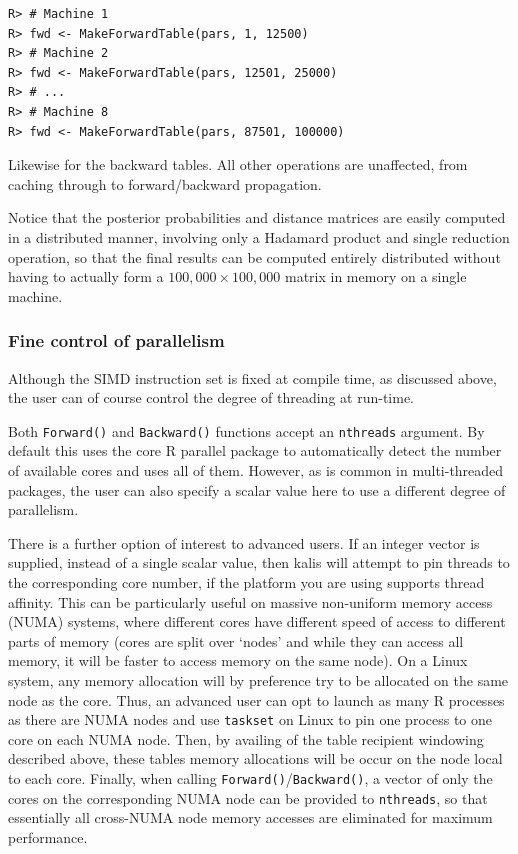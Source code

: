 \documentclass[a4paper]{article}
\let\proglang=\textsf
\newcommand{\pkg}[1]{{\fontseries{m}\fontseries{b}\selectfont #1}}
\begin{document}
\begin{verbatim}
R> # Machine 1
R> fwd <- MakeForwardTable(pars, 1, 12500)
R> # Machine 2
R> fwd <- MakeForwardTable(pars, 12501, 25000)
R> # ...
R> # Machine 8
R> fwd <- MakeForwardTable(pars, 87501, 100000)
\end{verbatim}

Likewise for the backward tables.
All other operations are unaffected, from caching through to forward/backward propagation.

Notice that the posterior probabilities and distance matrices are easily computed in a distributed manner, involving only a Hadamard product and single reduction operation, so that the final results can be computed entirely distributed without having to actually form a \(100,000 \times 100,000\) matrix in memory on a single machine.



\subsubsection*{Fine control of parallelism}
\label{fine-control-of-parallelism}

Although the SIMD instruction set is fixed at compile time, as discussed above, the user can of course control the degree of threading at run-time.

Both \texttt{Forward()} and \texttt{Backward()} functions accept an \texttt{nthreads} argument.
By default this uses the core \proglang{R} \pkg{parallel} package to automatically detect the number of available cores and uses all of them.
However, as is common in multi-threaded packages, the user can also specify a scalar value here to use a different degree of parallelism.

There is a further option of interest to advanced users.
If an integer vector is supplied, instead of a single scalar value, then \pkg{kalis} will attempt to pin threads to the corresponding core number, if the platform you are using supports thread affinity.
This can be particularly useful on massive non-uniform memory access (NUMA) systems, where different cores have different speed of access to different parts of memory (cores are split over `nodes' and while they can access all memory, it will be faster to access memory on the same node).
On a Linux system, any memory allocation will by preference try to be allocated on the same node as the core.
Thus, an advanced user can opt to launch as many \proglang{R} processes as there are NUMA nodes and use \texttt{taskset} on Linux to pin one process to one core on each NUMA node.
Then, by availing of the table recipient windowing described above, these tables memory allocations will be occur on the node local to each core.
Finally, when calling \texttt{Forward()}/\texttt{Backward()}, a vector of only the cores on the corresponding NUMA node can be provided to \texttt{nthreads}, so that essentially all cross-NUMA node memory accesses are eliminated for maximum performance.



\end{document}
